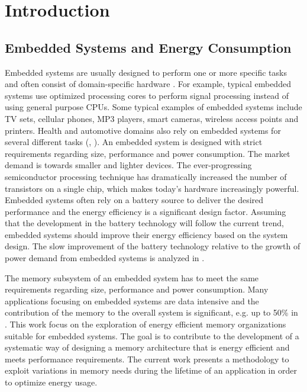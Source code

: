  \chapter{Introduction}
\label{intro}


\section{Embedded Systems and Energy Consumption}

Embedded systems are usually designed to perform one or more specific tasks and often consist of domain-specific hardware \cite{gajski1994specification}.
For example, typical embedded systems use optimized processing cores to perform signal processing instead of using general purpose CPUs.
Some typical examples of embedded systems include TV sets, cellular phones, MP3 players, smart cameras, wireless access points and printers. 
Health and automotive domains also rely on embedded systems for several different tasks (\cite{istepanian2004guest}, \cite{sangiovanni2007embedded}).
An embedded system is designed with strict requirements regarding size, performance and power consumption.
The market demand is towards smaller and lighter devices.
The ever-progressing semiconductor processing technique has dramatically increased the number of transistors on a single chip, which makes today's hardware increasingly powerful.
Embedded systems often rely on a battery source to deliver the desired performance and the energy efficiency is a significant design factor.
Assuming that the development in the battery technology will follow the current trend, embedded systems should improve their energy efficiency based on the system design.
The slow improvement of the battery technology relative to the growth of power
demand from embedded systems is analyzed in \cite{park2001battery}.

The memory subsystem of an embedded system has to meet the same requirements regarding size, performance and power consumption.
Many applications focusing on embedded systems are data intensive and the contribution of the memory to the overall system is significant, e.g. up to 50\% in \cite{Ben99}.
This work focus on the exploration of energy efficient memory organizations suitable for embedded systems.
The goal is to contribute to the development of a systematic way of designing a memory architecture that is energy efficient and meets performance requirements.
The current work presents a methodology to exploit variations in memory needs during the lifetime of an application in order to optimize energy usage.

